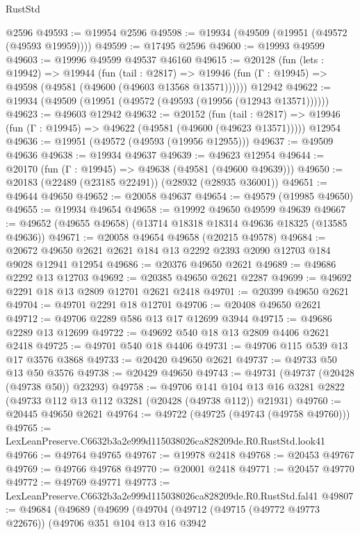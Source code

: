 \begin{lexlean}{RustStd}
\begin{coremodule}
    @2596
@49593 := @19954 @2596
@49598 := @19934 (@49509 (@19951 (@49572 (@49593 @19959))))
@49599 := @17495 @2596
@49600 := @19993 @49599
@49603 := @19996 @49599 @49537 @46160
@49615 := @20128
    (fun (lets : @19942) =>
    @19944
      (fun (tail : @2817) =>
      @19946 (fun (Γ : @19945) => @49598 (@49581 (@49600 (@49603 @13568 @13571))))))
    @12942
@49622 := @19934 (@49509 (@19951 (@49572 (@49593 (@19956 (@12943 @13571))))))
@49623 := @49603 @12942
@49632 := @20152
    (fun (tail : @2817) => @19946 (fun (Γ : @19945) => @49622 (@49581 (@49600 (@49623 @13571)))))
    @12954
@49636 := @19951 (@49572 (@49593 (@19956 @12955)))
@49637 := @49509 @49636
@49638 := @19934 @49637
@49639 := @49623 @12954
@49644 := @20170 (fun (Γ : @19945) => @49638 (@49581 (@49600 @49639)))
@49650 := @20183 (@22489 (@23185 @22491)) (@28932 (@28935 @36001))
@49651 := @49644 @49650
@49652 := @20058 @49637
@49654 := @49579 (@19985 @49650)
@49655 := @19934 @49654
@49658 := @19992 @49650 @49599 @49639
@49667 := @49652 (@49655 @49658) (@13714 @18318 @18314 @49636 @18325 (@13585 @49636))
@49671 := @20058 @49654 @49658 (@20215 @49578)
@49684 := @20672 @49650 @2621 @2621 @184 @13 @2292 @2393 @2090 @12703 @184 @9028 @12941 @12954
@49686 := @20376 @49650 @2621
@49689 := @49686 @2292 @13 @12703
@49692 := @20385 @49650 @2621 @2287
@49699 := @49692 @2291 @18 @13 @2809 @12701 @2621 @2418
@49701 := @20399 @49650 @2621
@49704 := @49701 @2291 @18 @12701
@49706 := @20408 @49650 @2621
@49712 := @49706 @2289 @586 @13 @17 @12699 @3944
@49715 := @49686 @2289 @13 @12699
@49722 := @49692 @540 @18 @13 @2809 @4406 @2621 @2418
@49725 := @49701 @540 @18 @4406
@49731 := @49706 @115 @539 @13 @17 @3576 @3868
@49733 := @20420 @49650 @2621
@49737 := @49733 @50 @13 @50 @3576
@49738 := @20429 @49650
@49743 := @49731 (@49737 (@20428 (@49738 @50)) @23293)
@49758 := @49706
    @141
    @104
    @13
    @16
    @3281
    @2822
    (@49733 @112 @13 @112 @3281 (@20428 (@49738 @112)) @21931)
@49760 := @20445 @49650 @2621
@49764 := @49722 (@49725 (@49743 (@49758 @49760)))
@49765 := LexLeanPreserve.C6632b3a2e999d115038026ca828209de.R0.RustStd.look41
@49766 := @49764 @49765
@49767 := @19978 @2418
@49768 := @20453 @49767
@49769 := @49766 @49768
@49770 := @20001 @2418
@49771 := @20457 @49770
@49772 := @49769 @49771
@49773 := LexLeanPreserve.C6632b3a2e999d115038026ca828209de.R0.RustStd.fal41
@49807 := @49684
    (@49689
      (@49699
        (@49704
          (@49712
            (@49715 (@49772 @49773 @22676))
            (@49706
              @351
              @104
              @13
              @16
              @3942

\end{coremodule}
\end{lexlean}
